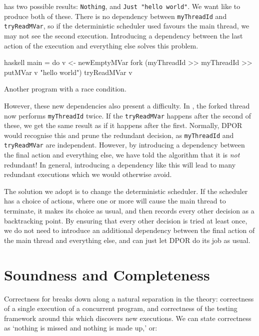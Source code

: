  has two possible results: \verb|Nothing|, and
\verb|Just "hello world"|.  We want like \dejafu{} to produce both of
these.  There is no dependency between \verb|myThreadId| and
\verb|tryReadMVar|, so if the deterministic scheduler used favours the
main thread, we may not see the second execution.  Introducing a
dependency between the last action of the execution and everything
else solves this problem.

\begin{listing}
\centering
\begin{cminted}{haskell}
main = do
  v <- newEmptyMVar
  fork (myThreadId >> myThreadId >> putMVar v "hello world")
  tryReadMVar v
\end{cminted}
\caption{Another program with a race condition.}\label{lst:daemon2}
\end{listing}

However, these new dependencies also present a difficulty.  In
, the forked thread now performs \verb|myThreadId|
twice.  If the \verb|tryReadMVar| happens after the second of these,
we get the same result as if it happens after the first.  Normally,
DPOR would recognise this and prune the redundant decision, as
\verb|myThreadId| and \verb|tryReadMVar| are independent.  However, by
introducing a dependency between the final action and everything else,
we have told the algorithm that it is \emph{not} redundant!  In
general, introducing a dependency like this will lead to many
redundant executions which we would otherwise avoid.

The solution we adopt is to change the deterministic scheduler.  If
the scheduler has a choice of actions, where one or more will cause
the main thread to terminate, it makes its choice as usual, and then
records every other decision as a backtracking point.  By ensuring
that every other decision is tried at least once, we do not need to
introduce an additional dependency between the final action of the
main thread and everything else, and can just let DPOR do its job as
usual.

\section{Soundness and Completeness}
\label{sec:dejafu-correctness}

Correctness for \dejafu{} breaks down along a natural separation in
the theory: correctness of a single execution of a concurrent program,
and correctness of the testing framework around this which discovers
new executions.  We can state correctness as `nothing is missed and
nothing is made up,' or:

